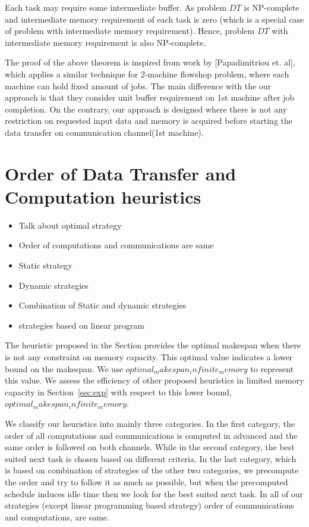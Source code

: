 \documentclass[runningheads]{llncs} %
\begin{document}
Each task may require some intermediate buffer. As problem $DT$ is NP-complete and intermediate 
memory requirement of each task is zero (which is a special case of problem with intermediate memory 
requirement). Hence, problem $DT$ with intermediate memory requirement is also NP-complete.





The proof of the above theorem is inspired from work by [Papadimitriou et. al], which applies a similar 
technique for 2-machine flowshop problem, where each machine can hold fixed amount of jobs. The 
main difference with the our approach is that they consider unit buffer requirement on 1st machine 
after job completion. On the contrary, our approach is designed where there is not any restriction on 
requested input data and memory is acquired before starting the data transfer on communication 
channel(1st machine).





	
	
	\section{Order of Data Transfer and Computation heuristics}
	\begin{itemize}
		\item Talk about optimal strategy
		\item Order of computations and communications are same
		\item Static strategy
		\item Dynamic strategies
		\item Combination of Static and dynamic strategies
		\item strategies based on linear program 
	\end{itemize}

The heuristic proposed in the Section provides the optimal makespan when there is not any constraint on memory capacity. This optimal value indicates a lower bound on the makespan. We use $optimal_makespan_infinite_memory$ to represent this value. We assess the efficiency of other proposed heuristics in limited memory capacity in Section~\ref{sec:exp} with respect to this lower bound, $optimal_makespan_infinite_memory$.


We classify our heuristics into mainly three categories. In the first category, the order of all computations and communications is computed in advanced and the same order is followed on both channels. While in the second category, the best suited next task is chosen based on different criteria. In the last category, which is based on combination of strategies of the other two categories, we precompute the order and try to follow it as much as possible, but when the precomputed schedule induces idle time then we look for the best suited next task. In all of our strategies (except linear programming based strategy) order of communications and computations, are same.
\end{document}
